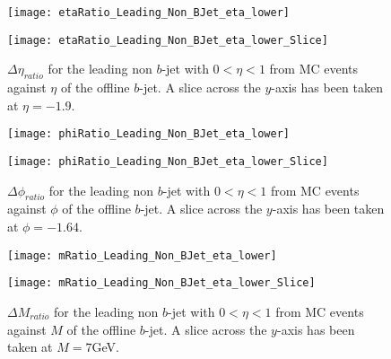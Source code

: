 		\begin{figure}[h]
			\centering

			\begin{minipage}[h]{0.33\linewidth}
				\texttt{[image: etaRatio\_Leading\_Non\_BJet\_eta\_lower]}
			\end{minipage}
			\quad
			\begin{minipage}[h]{0.33\linewidth}
				\texttt{[image: etaRatio\_Leading\_Non\_BJet\_eta\_lower\_Slice]}
			\end{minipage}
			\caption{$\Delta \eta_{ratio}$ for the leading \pt non $b$-jet with $0 < \eta < 1$ from MC events against $\eta$ of the offline $b$-jet. A slice across the $y$-axis has been taken at $\eta=-1.9$. }
			\label{fig:MC:leadingnonbetacentral}
		\end{figure}

		\begin{figure}[h]
			\centering

			\begin{minipage}[h]{0.33\linewidth}
				\texttt{[image: phiRatio\_Leading\_Non\_BJet\_eta\_lower]}
			\end{minipage}
			\quad
			\begin{minipage}[h]{0.33\linewidth}
				\texttt{[image: phiRatio\_Leading\_Non\_BJet\_eta\_lower\_Slice]}
			\end{minipage}
			\caption{$\Delta \phi_{ratio}$ for the leading \pt non $b$-jet with $0 < \eta < 1$ from MC events against $\phi$ of the offline $b$-jet. A slice across the $y$-axis has been taken at $\phi=-1.64$. }
			\label{fig:MC:leadingnonbphicentral}
		\end{figure}

		\begin{figure}[h]
			\centering

			\begin{minipage}[h]{0.33\linewidth}
				\texttt{[image: mRatio\_Leading\_Non\_BJet\_eta\_lower]}
			\end{minipage}
			\quad
			\begin{minipage}[h]{0.33\linewidth}
				\texttt{[image: mRatio\_Leading\_Non\_BJet\_eta\_lower\_Slice]}
			\end{minipage}
			\caption{$\Delta M_{ratio}$ for the leading \pt non $b$-jet with $0 < \eta < 1$ from MC events against $M$ of the offline $b$-jet. A slice across the $y$-axis has been taken at $M=7$GeV. }
			\label{fig:MC:leadingnonbmcentral}
		\end{figure}


